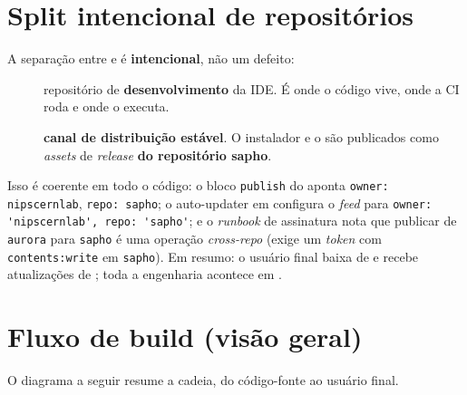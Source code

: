 \section{Split intencional de repositórios}
\label{sec:16-split}

A separação entre  e  é \textbf{intencional}, não um
defeito:

\begin{description}
  \item[] repositório de \textbf{desenvolvimento} da IDE. É onde o
        código vive, onde a CI roda e onde o  executa.
  \item[] \textbf{canal de distribuição estável}. O instalador
         e o  são
        publicados como \emph{assets} de \emph{release} \textbf{do repositório
        sapho}.
\end{description}

\noindent
Isso é coerente em todo o código: o bloco \texttt{publish} do 
aponta \lstinline|owner: nipscernlab|, \lstinline|repo: sapho|; o auto-updater em
 configura o \emph{feed} para
\lstinline|owner: 'nipscernlab', repo: 'sapho'|; e o \emph{runbook} de assinatura
nota que publicar de \texttt{aurora} para \texttt{sapho} é uma operação
\emph{cross-repo} (exige um \emph{token} com \lstinline|contents:write| em
\texttt{sapho}). Em resumo: o usuário final baixa de  e recebe
atualizações de ; toda a engenharia acontece em .

\section{Fluxo de build (visão geral)}
\label{sec:16-fluxo}

O diagrama a seguir resume a cadeia, do código-fonte ao usuário final.

